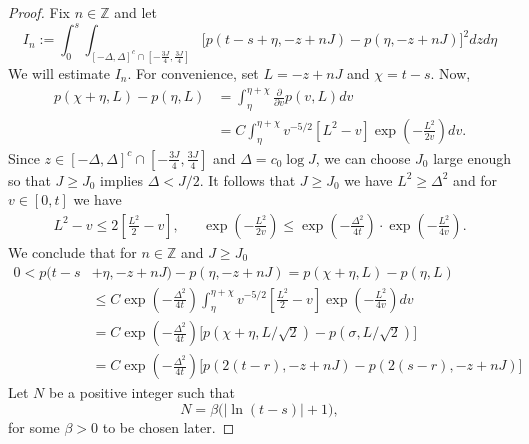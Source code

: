 \documentclass[10pt,a4paper]{amsart}
\newcommand{\Z}{\mathbb{Z}}
\begin{document}
\begin{proof}
Fix $n \in \Z$ and let
\begin{equation} \label{eq:term_n}
I_n :=  \int_{0}^{s}
    \int_{[-\Delta,\Delta]^c\cap\left[-\frac{3J}{4},\frac{3J}{4}\right]}
    \Big[p(t-s +\eta,-z+nJ)-p(\eta,-z+nJ)\Big]^2dzd\eta
\end{equation}
We will estimate $I_n$. For convenience, 
set $L=-z+nJ$ and $\chi=t-s$. Now, 
\begin{align*}
p(\chi +\eta,L)-p(\eta,L)
&= \int_{\eta}^{\eta+\chi }\frac{\partial}{\partial v}p(v,L)dv  \\
&= C\int_{\eta}^{\eta+\chi }v^{-5/2}[L^2-v]
           \exp\left(-\frac{L^2}{2v}\right)dv.  
\end{align*}
Since $z\in [-\Delta,\Delta]^c\cap\left[-\frac{3J}{4},\frac{3J}{4}\right]$ 
and $\Delta=c_0\log J$, we can choose $J_0$ large enough so that 
$J\geq J_0$ implies $\Delta<J/2$.  It follows that $J \geq J_0$ we have  
$L^2\ge\Delta^2$ and for $v\in[0,t]$ we 
have
\begin{align*}
L^2-v \le 2\left[\frac{L^2}{2}-v\right],
&&  \exp\left(-\frac{L^2}{2v}\right) \le 
   \exp\left(-\frac{\Delta^2}{4t}\right)
   \cdot\exp\left(-\frac{L^2}{4v}\right).  
\end{align*}
We conclude that for $n \in \Z$ and $J \geq J_0$
\begin{equation} \label{eq:diff_p_s}
\begin{split}
0 < p(t-s &+\eta,-z+nJ)-p(\eta,-z+nJ)  = p(\chi +\eta,L)-p(\eta,L)\\ &\le 
   C\exp\left(-\frac{\Delta^2}{4t}\right)
     \int_{\eta}^{\eta+\chi }v^{-5/2}\left[\frac{L^2}{2}-v\right]
           \exp\left(-\frac{L^2}{4v}\right)dv   \\
&= C\exp\left(-\frac{\Delta^2}{4t}\right)
     \Big[p(\chi +\eta,L/\sqrt{2})-p(\sigma,L/\sqrt{2})\Big]  \\
&= C\exp\left(-\frac{\Delta^2}{4t}\right)
     \Big[p(2(t-r),-z+nJ)-p(2(s-r),-z+nJ)\Big]
\end{split}
\end{equation}
Let $N$ be a positive integer such that
\begin{equation} \label{eq:Nchoice}
N = \beta \big(|\ln(t-s)|+1\big),
\end{equation}
for some $\beta>0$ to be chosen later.


\end{proof}
\end{document}
